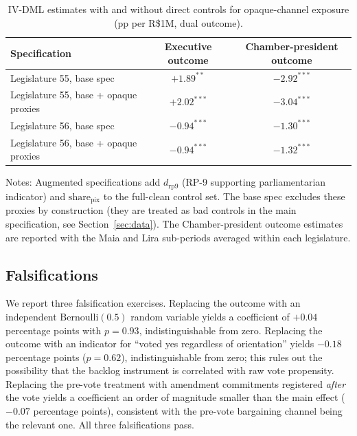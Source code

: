 \documentclass[pdflatex,sn-basic]{sn-jnl}
\begin{document}
\begin{table}[htbp]
\centering
\caption{IV-DML estimates with and without direct controls for opaque-channel exposure (pp per R\$1M, dual outcome).}
\label{tab:rp9_controls}
\small
\begin{tabular}{lcc}
\toprule
Specification & Executive outcome & Chamber-president outcome \\
\midrule
Legislature 55, base spec                 & $+1.89^{**}$  & $-2.92^{***}$ \\
Legislature 55, base + opaque proxies     & $+2.02^{***}$ & $-3.04^{***}$ \\
Legislature 56, base spec                 & $-0.94^{***}$ & $-1.30^{***}$ \\
Legislature 56, base + opaque proxies     & $-0.94^{***}$ & $-1.32^{***}$ \\
\bottomrule
\end{tabular}
\begin{tablenotes}
\small
\item Notes: Augmented specifications add $d_{\mathrm{rp9}}$ (RP-9 supporting parliamentarian indicator) and $\mathrm{share}_{\mathrm{pix}}$ to the full-clean control set. The base spec excludes these proxies by construction (they are treated as bad controls in the main specification, see Section~\ref{sec:data}). The Chamber-president outcome estimates are reported with the Maia and Lira sub-periods averaged within each legislature.
\end{tablenotes}
\end{table}

\subsection{Falsifications}
\label{app:falsifications}

We report three falsification exercises. Replacing the outcome with an independent $\mathrm{Bernoulli}(0.5)$ random variable yields a coefficient of $+0.04$ percentage points with $p = 0.93$, indistinguishable from zero. Replacing the outcome with an indicator for ``voted yes regardless of orientation'' yields $-0.18$ percentage points ($p = 0.62$), indistinguishable from zero; this rules out the possibility that the backlog instrument is correlated with raw vote propensity. Replacing the pre-vote treatment with amendment commitments registered \emph{after} the vote yields a coefficient an order of magnitude smaller than the main effect ($-0.07$ percentage points), consistent with the pre-vote bargaining channel being the relevant one. All three falsifications pass.
\end{document}
